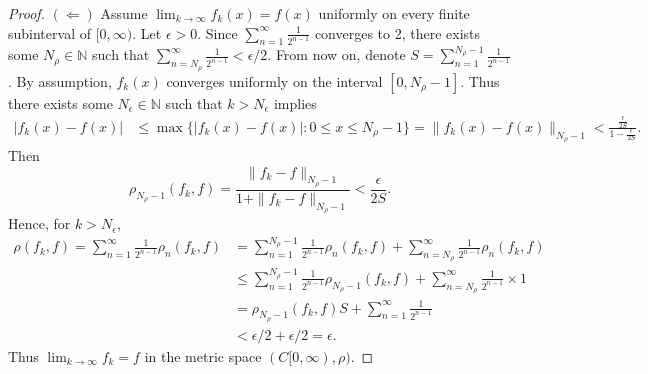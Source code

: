\documentclass[12pt]{article}
\begin{document}
\begin{itemize}[label={},leftmargin=4mm, itemsep=1em, parsep=1em]
  \begin{proof}
    $(\Leftarrow)$ Assume $\lim_{k\rightarrow \infty}f_{k}(x) = f(x)$ uniformly
    on every finite subinterval of $[0,\infty)$. Let $\epsilon > 0$. Since
    $\sum_{n=1}^{\infty}\frac{1}{2^{n-1}}$ converges to 2, there exists some
    $N_{\rho} \in \mathbb{N}$ such that
    $\sum_{n=N_{\rho}}^{\infty}\frac{1}{2^{n-1}} < \epsilon / 2$. From now on,
    denote $S = \sum_{n=1}^{N_{\rho}-1}\frac{1}{2^{n-1}}$. By assumption,
    $f_{k}(x)$ converges uniformly on the interval $[0,N_{\rho}-1]$. Thus there
    exists some $N_{\epsilon} \in \mathbb{N}$ such that $k > N_{\epsilon}$
    implies 
    \begin{align*}
      |f_{k}(x) - f(x)| & \leq \max\{|f_{k}(x) - f(x)| : 0 \leq x \leq
      N_{\rho}-1\} = \|f_{k}(x) - f(x)\|_{N_{\rho}-1} < \frac{\frac{\epsilon}{2S}}{1 - \frac{\epsilon}{2S}}.
    \end{align*}
    Then 
    \[ \rho_{N_{\rho}-1}(f_{k}, f) = \frac{\|f_{k} - f\|_{N_{\rho}-1}}{1 +
    \|f_{k} - f\|_{N_{\rho}-1}} < \frac{\epsilon}{2S}. \]
    Hence, for $k > N_{\epsilon}$,
    \begin{align*}
      \rho(f_{k}, f) = \sum_{n=1}^{\infty}\frac{1}{2^{n-1}}\rho_{n}(f_{k},f)
      & = \sum_{n=1}^{N_{\rho}-1}\frac{1}{2^{n-1}}\rho_{n}(f_{k},f) +
      \sum_{n=N_{\rho}}^{\infty}\frac{1}{2^{n-1}}\rho_{n}(f_{k},f) \\
      & \leq \sum_{n=1}^{N_{\rho}-1}\frac{1}{2^{n-1}}\rho_{N_{\rho}-1}(f_{k}, f)
      + \sum_{n=N_{\rho}}^{\infty}\frac{1}{2^{n-1}} \times 1 \\
      & = \rho_{N_{\rho}-1}(f_{k},f)S + \sum_{n=1}^{\infty}\frac{1}{2^{n-1}} \\
      & < \epsilon / 2 + \epsilon / 2 = \epsilon.
    \end{align*}
    Thus $\lim_{k\rightarrow \infty}f_{k} = f$ in the metric space
    $(C[0,\infty), \rho)$.


\end{proof}
\end{itemize}
\end{document}
